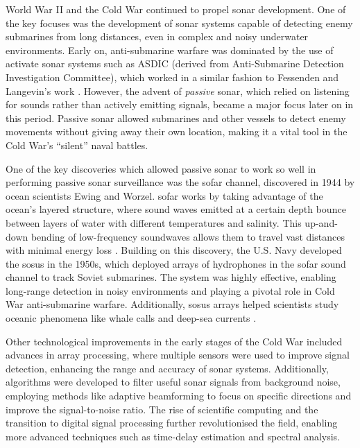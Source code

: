 World War II and the Cold War continued to propel sonar development. One of the key focuses was the development of sonar systems capable of detecting enemy submarines from long distances, even in complex and noisy underwater environments. Early on, anti-submarine warfare was dominated by the use of activate sonar systems such as ASDIC (derived from Anti-Submarine Detection Investigation Committee), which worked in a similar fashion to Fessenden and Langevin's work \cite{helgason_asdic_2011}. However, the advent of \textit{passive} sonar, which relied on listening for sounds rather than actively emitting signals, became a major focus later on in this period. Passive sonar allowed submarines and other vessels to detect enemy movements without giving away their own location, making it a vital tool in the Cold War's ``silent'' naval battles. 

One of the key discoveries which allowed passive sonar to work so well in performing passive sonar surveillance was the \acrfull{sofar} channel, discovered in 1944 by ocean scientists Ewing and Worzel. \acrshort{sofar} works by taking advantage of the ocean’s layered structure, where sound waves emitted at a certain depth bounce between layers of water with different temperatures and salinity. This up-and-down bending of low-frequency soundwaves allows them to travel vast distances with minimal energy loss \cite{national_oceanic_and_atmospheric_association_what_2024}. Building on this discovery, the U.S. Navy developed the \acrfull{sosus} in the 1950s, which deployed arrays of hydrophones in the \acrshort{sofar} sound channel to track Soviet submarines. The system was highly effective, enabling long-range detection in noisy environments and playing a pivotal role in Cold War anti-submarine warfare. Additionally, \acrshort{sosus} arrays helped scientists study oceanic phenomena like whale calls and deep-sea currents \cite{morin_history_nodate}.

Other technological improvements in the early stages of the Cold War included advances in array processing, where multiple sensors were used to improve signal detection, enhancing the range and accuracy of sonar systems. Additionally, algorithms were developed to filter useful sonar signals from background noise, employing methods like adaptive beamforming to focus on specific directions and improve the signal-to-noise ratio. The rise of scientific computing and the transition to digital signal processing further revolutionised the field, enabling more advanced techniques such as time-delay estimation and spectral analysis.

